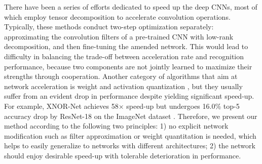 \documentclass[letterpaper]{article} %
\begin{document}
There have been a series of efforts dedicated to speed up the deep CNNs, most of which \cite{lebedev2014speeding,tai2015convolutional} employ tensor decomposition to accelerate convolution operations. Typically, these methods conduct two-step optimization separately: approximating the convolution filters of a pre-trained CNN with low-rank decomposition, and then fine-tuning the amended network. This would lead to difficulty in balancing the trade-off between acceleration rate and recognition performance, because two components are not jointly learned to maximize their strengths through cooperation. Another category of algorithms that aim at network acceleration is weight and activation quantization \cite{rastegari2016xnor,cai2017deep,chen2015compressing}, but they usually suffer from an evident drop in performance despite yielding significant speed-up. For example, XNOR-Net \cite{rastegari2016xnor} achieves 58$\times$ speed-up but undergoes 16.0\% top-5 accuracy drop by ResNet-18 on the ImageNet dataset \cite{russakovsky2015imagenet}. Therefore, we present our method according to the following two principles: 1) no explicit network modification such as filter approximation or weight quantitation is needed, which helps to easily generalize to networks with different architectures; 2) the network should enjoy desirable speed-up with tolerable deterioration in performance.

\end{document}
